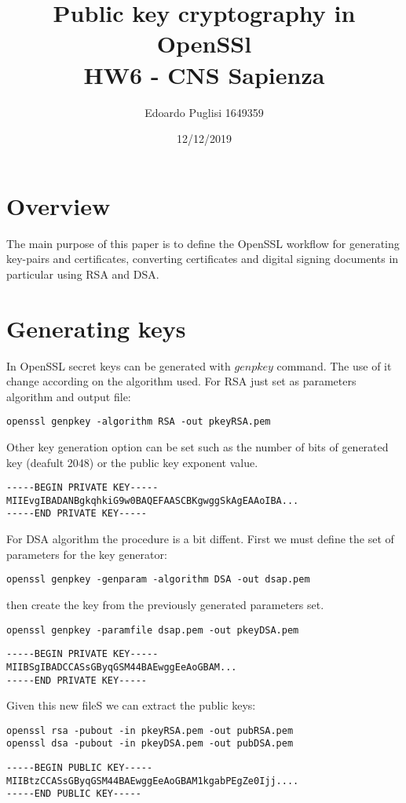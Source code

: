 \documentclass[11pt,a4paper]{article}
\title{Public key cryptography in OpenSSl \\ HW6 - CNS Sapienza}
\author{Edoardo Puglisi 1649359}
\date{12/12/2019}
\begin{document}
\lstset{breaklines=true}
	
\maketitle
\tableofcontents
\clearpage

\section{Overview}
The main purpose of this paper is to define the OpenSSL workflow for generating key-pairs and certificates, converting certificates and digital signing documents in particular using RSA and DSA.

\section{Generating keys}
In OpenSSL secret keys can be generated with $genpkey$ command. The use of it change according on the algorithm used. For RSA just set as parameters algorithm and output file:
\begin{lstlisting}[backgroundcolor = \color{lightgray}]
openssl genpkey -algorithm RSA -out pkeyRSA.pem
\end{lstlisting}
Other key generation option can be set such as the number of bits of generated key (deafult 2048) or the public key exponent value.
\begin{lstlisting}[backgroundcolor = \color{lightgray}]
-----BEGIN PRIVATE KEY-----
MIIEvgIBADANBgkqhkiG9w0BAQEFAASCBKgwggSkAgEAAoIBA...
-----END PRIVATE KEY-----
\end{lstlisting}
For DSA algorithm the procedure is a bit diffent. First we must define the set of parameters for the key generator:
\begin{lstlisting}[backgroundcolor = \color{lightgray}]
openssl genpkey -genparam -algorithm DSA -out dsap.pem
\end{lstlisting}
then create the key from the previously generated parameters set.
\begin{lstlisting}[backgroundcolor = \color{lightgray}]
openssl genpkey -paramfile dsap.pem -out pkeyDSA.pem
\end{lstlisting}
\begin{lstlisting}[backgroundcolor = \color{lightgray}]
-----BEGIN PRIVATE KEY-----
MIIBSgIBADCCASsGByqGSM44BAEwggEeAoGBAM...
-----END PRIVATE KEY-----
\end{lstlisting}
Given this new fileS we can extract the public keys:
\begin{lstlisting}[backgroundcolor = \color{lightgray}]
openssl rsa -pubout -in pkeyRSA.pem -out pubRSA.pem
openssl dsa -pubout -in pkeyDSA.pem -out pubDSA.pem
\end{lstlisting}
\begin{lstlisting}[backgroundcolor = \color{lightgray}]
-----BEGIN PUBLIC KEY-----
MIIBtzCCASsGByqGSM44BAEwggEeAoGBAM1kgabPEgZe0Ijj....
-----END PUBLIC KEY-----
\end{lstlisting}
\end{document}
